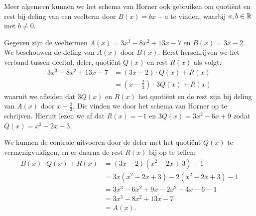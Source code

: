 \documentclass{ximera}
\begin{document}
\begin{Uitbreiding}
Meer algemeen kunnen we het schema van Horner ook gebruiken om quoti\"ent en rest bij deling van een veelterm door $B(x) = bx-a$ te vinden, waarbij $a,b \in \mathbb{R}$ met $b \neq 0$. 

\begin{example}
Gegeven zijn de veeltermen $A(x) = 3x^3-8x^2+13x-7$ en $B(x) = 3x-2$. We beschouwen de deling van $A(x)$ door $B(x)$. Eerst herschrijven we het verband tussen deeltal, deler, quoti\"ent $Q(x)$ en rest $R(x)$ als volgt:
\begin{align*}
3x^3-8x^2+13x-7 
& = (3x-2)\cdot Q(x) + R(x) \\
& = \left(x-\frac{2}{3}\right) \cdot \,3Q(x) + R(x)
\end{align*}
waaruit we afleiden dat $3Q(x)$ en $R(x)$ het quoti\"ent en de rest zijn bij deling van $A(x)$ door $x - \frac{2}{3}$. Die vinden we door het schema van Horner op te schrijven.
\renewcommand{\kolbreed}{\widthof{$-8$}}
Hieruit lezen we af dat $R(x) = -1$ en $3Q(x) = 3x^2 - 6x + 9$ zodat $Q(x) = x^2-2x+3$.

We kunnen de controle uitvoeren door de deler met het quoti\"ent $Q(x)$ te vermenigvuldigen, en er daarna de rest $R(x)$ bij op te tellen:
\begin{align*}
B(x) \cdot Q(x) + R(x) 
& = (3x-2)(x^2-2x+3) - 1 \\
& = 3x(x^2-2x+3) - 2(x^2-2x+3) - 1 \\
& = 3x^3 - 6x^2 + 9x - 2x^2 + 4x - 6 - 1 \\
& =  3x^3-8x^2+13x-7 \\
& = A(x).
\end{align*}
\end{example}
\end{Uitbreiding}


{}
\end{document}
